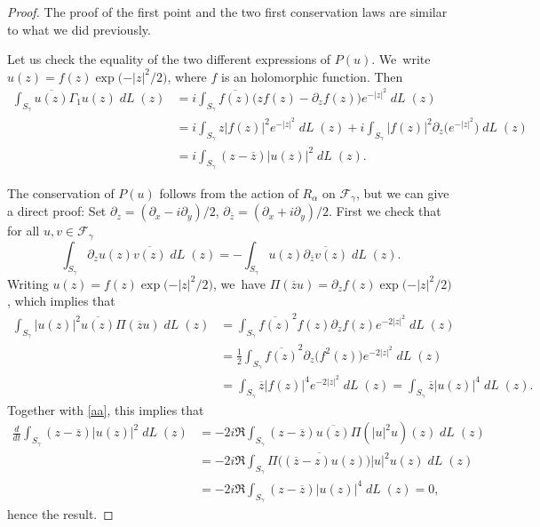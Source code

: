 \documentclass[10pt]{amsart}
\DeclareMathOperator{\dL}{\mathit{dL}}
\theoremstyle{definition}
\let\EE\exp
\let\ov\overline
\begin{document}
\begin{proof}
The proof of the first point and the two first conservation laws are similar to what we did previously.

Let us check the equality of the two different expressions of $P(u)$. We~write $u(z)=f(z)\EE\bigl({-{|z|^2}/2}\bigr)$, where $f$ is an holomorphic function. Then
\begin{align*}
\int_{S_{\gamma}}\ov{u(z)} \Gamma_1 u(z)\dL(z)&= i \int_{S_{\gamma}}\ov{f(z)}\bigl(z f(z) -\partial_z f(z)\bigr) e^{-|z|^2} \dL(z) \\
&= i \int_{S_{\gamma}} z |f(z)|^2 e^{-|z|^2} \dL(z)+ i \int_{S_{\gamma}} |f(z)|^2 \partial_z \bigl(e^{-|z|^2} \bigr) \dL(z) \\
&= i \int_{S_{\gamma}}(z-\ov{z})|u(z)|^{2}\dL(z).
\end{align*}

The conservation of $P(u)$ follows from the action of $R_{\alpha}$ on $\mathcal{F}_{\gamma}$, but we can give a direct proof: Set $\partial_{z}=(\partial_{x}-i\partial_{y})/2$, $\partial_{\overline{z}}=(\partial_{x}+i\partial_{y})/2$. First we check that for all $u,v\in \mathcal{F}_{\gamma}$
\begin{equation*}
\int_{S_{\gamma}} \partial_z u(z) \ov{v(z)}\dL(z)= -\int_{S_{\gamma}} u(z) \ov{\partial_{\ov{z}}v(z)}\dL(z).
\end{equation*}
Writing $u(z)=f(z)\EE\bigl({-\vert z\vert^2/2}\bigr)$, we~have $\Pi(\ov{z}u)=\partial_z f(z)\EE\bigl({-\vert z\vert^2/2}\bigr)$, which implies that
\begin{align*}
\int_{S_{\gamma}} \vert {u(z)} \vert^2\ov{u(z)}\Pi(\ov{z}u)\dL(z) &= \int_{S_{\gamma}} \ov{f(z)}^2f(z) \partial_z f(z) e^{-2\vert z\vert^2}\dL(z) \\
&=\frac12 \int_{S_{\gamma}} \ov{f(z)}^2 \partial_z\bigl(f^2(z)\bigr) e^{-2\vert z\vert^2}\dL(z)\\
&= \int_{S_{\gamma}}\ov{z}\vert f(z)\vert^4 e^{-2\vert z\vert^2}\dL(z) 
= \int_{S_{\gamma}}\ov{z}\vert u(z)\vert^4 \dL(z).
\end{align*}
Together with \eqref{aa}, this implies that
\begin{align*}
\frac{d}{dt}\int_{S_{\gamma}}(z-\ov{z})|u(z)|^{2}\dL(z) &= -2i \Re \int_{S_{\gamma}}(z-\ov{z})\ov{u(z)} \Pi(|u|^{2}u)(z)\dL(z) \\
& = -2i \Re \int_{S_{\gamma}}\ov{\Pi\bigl((\ov{z}-z)u(z)\bigr)}|u|^{2}u(z)\dL(z) \\
& = -2i \Re \int_{S_{\gamma}}(z-\ov{z})|u(z)|^{4}\dL(z)=0,
\end{align*}
hence the result.
\end{proof}
\end{document}
